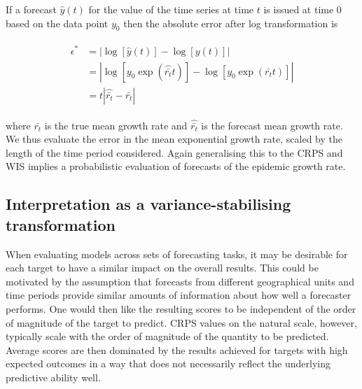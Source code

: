 \documentclass{article}
\begin{document}
If a forecast $\hat{y}(t)$ for the value of the time series at time $t$ is issued at time 0 based on the data point $y_0$ then the absolute error after log transformation is
%
\begin{linenomath*}
\begin{align}
\begin{split}
\epsilon^* &= \left| \log \left[ \hat{y}( t ) \right] - \log \left[ y ( t ) \right] \right|\\
           &= \left| \log \left[ y_0 \exp (\hat{\bar{r_t}} t ) \right] - \log \left[ y_0 \exp (\bar{r_t}t) \right] \right|\\
           &= t \left| \hat{\bar{r_t}} - \bar{r_t} \right|
\end{split}
\end{align}
\end{linenomath*}
%
where $\bar{r_t}$ is the true mean growth rate and $\hat{\bar{r_t}}$ is the forecast mean growth rate. We thus evaluate the error in the mean exponential growth rate, scaled by the length of the time period considered. Again generalising this to the CRPS and WIS implies a probabilistic evaluation of forecasts of the epidemic growth rate.

\subsection{Interpretation as a variance-stabilising transformation}
\label{sec:methods:vst}

When evaluating models across sets of forecasting tasks, it may be desirable for each target to have a similar impact on the overall results. This could be motivated by the assumption that forecasts from different geographical units and time periods provide similar amounts of information about how well a forecaster performs. One would then like the resulting scores to be independent of the order of magnitude of the target to predict. CRPS values on the natural scale, however, typically scale with the order of magnitude of the quantity to be predicted. Average scores are then dominated by the results achieved for targets with high expected outcomes in a way that does not necessarily reflect the underlying predictive ability well.
\end{document}
